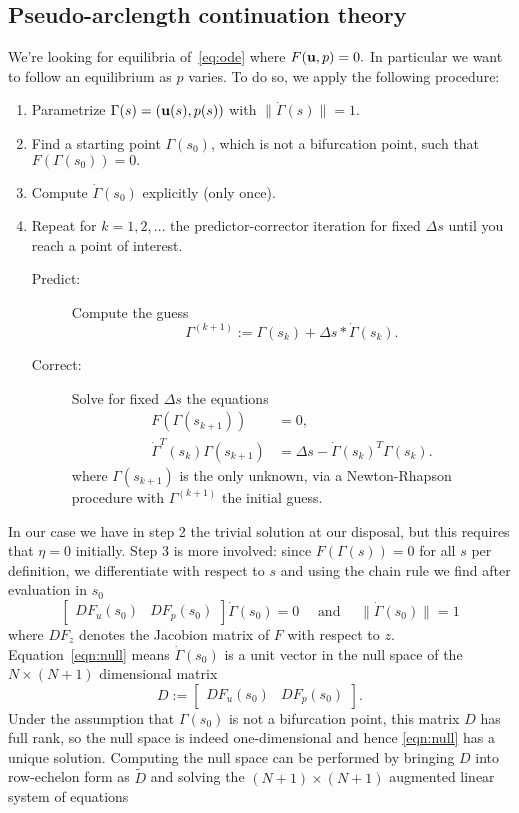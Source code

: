 \subsection{Pseudo-arclength continuation theory}
We're looking for equilibria of~\eqref{eq:ode} where $F(\mathbf{u}, p) = 0.$ In particular we want to follow an equilibrium as $p$ varies. To do so, we apply the following procedure:
\begin{enumerate}
  \item Parametrize $\Gamma(s) = (\mathbf{u}(s), p(s))$ with $\|\dot\Gamma(s)\| = 1.$
  \item Find a starting point $\Gamma(s_0)$, which is not a bifurcation point, such that $F(\Gamma(s_0)) = 0.$ 
  \item Compute $\dot\Gamma(s_0)$ explicitly (only once).
  \item Repeat for $k = 1, 2, \dots$ the predictor-corrector iteration for fixed $\Delta s$ until you reach a point of interest.
  \begin{description}
    \item[Predict:] Compute the guess $$\Gamma^{(k+1)} := \Gamma(s_k) + \Delta s * \dot\Gamma(s_k).$$
    \item[Correct:] Solve for fixed $\Delta s$ the equations \begin{equation}\begin{aligned}\label{eq:hoi}
      F(\Gamma(s_{k+1})) &= 0, \\
      \dot\Gamma^T(s_k)\Gamma(s_{k+1}) &= \Delta s - \dot\Gamma(s_k)^T\Gamma(s_k).
    \end{aligned}
    \end{equation}
    where $\Gamma(s_{k+1})$ is the only unknown, via a Newton-Rhapson procedure with $\Gamma^{(k+1)}$ the initial guess.
  \end{description}
\end{enumerate}
In our case we have in step 2 the trivial solution at our disposal, but this requires that $\eta = 0$ initially. Step 3 is more involved: since $F(\Gamma(s)) = 0$ for all $s$ per definition, we differentiate with respect to $s$ and using the chain rule we find after evaluation in $s_0$
\begin{equation}\label{eqn:null}
  \begin{bmatrix}
    DF_u(s_0) & DF_p(s_0)
  \end{bmatrix}\Dot\Gamma(s_0)
  = 0 \quad \text{ and } \quad \|\dot\Gamma(s_0)\| = 1
\end{equation}
where $DF_z$ denotes the Jacobion matrix of $F$ with respect to $z.$ Equation~\eqref{eqn:null} means $\dot\Gamma(s_0)$ is a unit vector in the null space of the $N \times (N + 1)$ dimensional matrix $$D := \begin{bmatrix} DF_u(s_0) & DF_p(s_0) \end{bmatrix}.$$ Under the assumption that $\Gamma(s_0)$ is not a bifurcation point, this matrix $D$ has full rank, so the null space is indeed one-dimensional and hence \eqref{eqn:null} has a unique solution. Computing the null space can be performed by bringing $D$ into row-echelon form as $\tilde{D}$ and solving the $(N + 1) \times (N + 1)$ augmented linear system of equations
